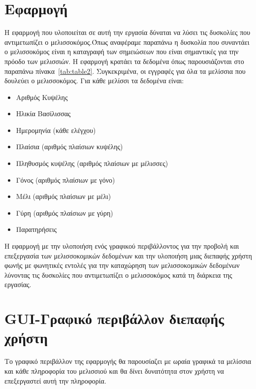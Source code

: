 \documentclass[oneside, 12pt]{book}
\begin{document}
\section{Εφαρμογή}
\label{sec:εφαρμογή}
Η εφαρμογή που υλοποιείται σε αυτή την εργασία δύναται να λύσει τις δυσκολίες που αντιμετωπίζει ο μελισσοκόμος.Όπως αναφέραμε παραπάνω η δυσκολία που συναντάει ο μελισσοκόμος είναι η καταγραφή των σημειώσεων που είναι σημαντικές για την πρόοδο των μελισσιών. Η εφαρμογή κρατάει τα δεδομένα όπως παρουσιάζονται στο παραπάνω πίνακα~\ref{tab:table2}. Συγκεκριμένα, οι εγγραφές για όλα τα μελίσσια που δουλεύει ο μελισσοκόμος.
\newline
Για κάθε μελίσσι τα δεδομένα είναι:
\begin{itemize}
  \item Αριθμός Κυψέλης
  \item Ηλικία Βασίλισσας
  \item Ημερομηνία (κάθε ελέγχου)
  \item Πλαίσια (αριθμός πλαίσιων κυψέλης)
  \item Πληθυσμός κυψέλης (αριθμός πλαίσιων με μέλισσες)
  \item Γόνος (αριθμός πλαίσιων με γόνο)
  \item Μέλι (αριθμός πλαίσιων με μέλι)
  \item Γύρη (αριθμός πλαίσιων με γύρη)
  \item Παρατηρήσεις
\end{itemize}
Η εφαρμογή με την υλοποιήση ενός γραφικού περιβάλλοντος για την προβολή και επεξεργασία των μελισσοκομικών δεδομένων και την υλοποιήση μιας διεπαφής χρήστη φωνής με φωνητικές εντολές για την καταχώρηση των μελισσοκομικών δεδομένων λύνοντας τις δυσκολίες που αντιμετωπίζει ο μελισσοκόμος κατά τη διάρκεια της εργασίας.
\section{GUI-Γραφικό περιβάλλον διεπαφής χρήστη}
\label{sec:gui-γραφικό-περιβάλλον-χρήστη}
Το γραφικό περιβάλλον της εφαρμογής θα παρουσίαζει με ωραία γραφικά τα μελίσσια και κάθε πληροφορία του μελισσιού και θα δίνει δυνατότητα στον χρήστη να επεξεργαστεί αυτή την πληροφορία.
\end{document}
